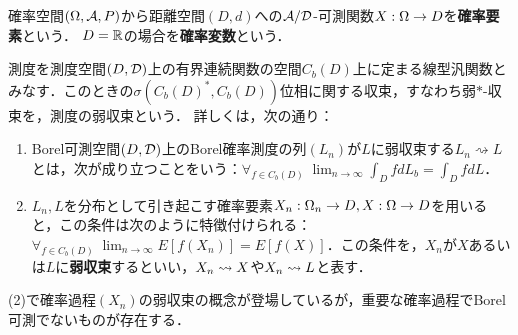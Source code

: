 \documentclass[uplatex,dvipdfmx]{jsreport}
\begin{document}
\begin{definition}
    確率空間$(\Omega,\mathcal{A},P)$から距離空間$(D,d)$への$\mathcal{A}/\mathcal{D}$-可測関数$X:\Omega\to D$を\textbf{確率要素}という．
    $D=\mathbb{R}$の場合を\textbf{確率変数}という．
\end{definition}

\begin{definition}
    測度を測度空間$(D,\mathcal{D})$上の有界連続関数の空間$C_b(D)$上に定まる線型汎関数とみなす．このときの$\sigma(C_b(D)^*,C_b(D))$位相に関する収束，すなわち弱$*$-収束を，測度の弱収束という．
    詳しくは，次の通り：
    \begin{enumerate}
        \item Borel可測空間$(D,\mathcal{D})$上のBorel確率測度の列$(L_n)$が$L$に弱収束する$L_n\rightsquigarrow L$とは，次が成り立つことをいう：$\forall_{f\in C_b(D)}\;\lim_{n\to\infty}\int_DfdL_b=\int_DfdL$．
        \item $L_n,L$を分布として引き起こす確率要素$X_n:\Omega_n\to D,X:\Omega\to D$を用いると，この条件は次のように特徴付けられる：$\forall_{f\in C_b(D)}\;\lim_{n\to\infty}E[f(X_n)]=E[f(X)]$．この条件を，$X_n$が$X$あるいは$L$に\textbf{弱収束}するといい，$X_n\rightsquigarrow X$や$X_n\rightsquigarrow L$と表す．
    \end{enumerate}
\end{definition}
\begin{remark}
    (2)で確率過程$(X_n)$の弱収束の概念が登場しているが，重要な確率過程でBorel可測でないものが存在する．
\end{remark}
\end{document}
